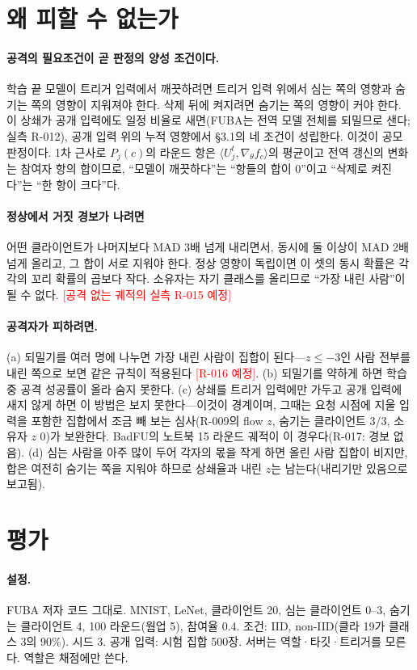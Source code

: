 \documentclass[10pt,a4paper]{article}
\newcommand{\todo}[1]{\textcolor{red}{[#1]}}
\begin{document}
\section{왜 피할 수 없는가}
\paragraph{공격의 필요조건이 곧 판정의 양성 조건이다.} 학습 끝 모델이 트리거 입력에서 깨끗하려면 트리거 입력 위에서 심는 쪽의 영향과 숨기는 쪽의 영향이 지워져야 한다. 삭제 뒤에 켜지려면 숨기는 쪽의 영향이 커야 한다. 이 상쇄가 공개 입력에도 일정 비율로 새면(FUBA는 전역 모델 전체를 되밀므로 샌다; 실측 R-012), 공개 입력 위의 누적 영향에서 \S3.1의 네 조건이 성립한다. 이것이 공모 판정이다. 1차 근사로 $P_j(c)$의 라운드 항은 $\langle U_j^t,\nabla_\theta f_c\rangle$의 평균이고 전역 갱신의 변화는 참여자 항의 합이므로, ``모델이 깨끗하다''는 ``항들의 합이 0''이고 ``삭제로 켜진다''는 ``한 항이 크다''다.
\paragraph{정상에서 거짓 경보가 나려면} 어떤 클라이언트가 나머지보다 MAD 3배 넘게 내리면서, 동시에 둘 이상이 MAD 2배 넘게 올리고, 그 합이 서로 지워야 한다. 정상 영향이 독립이면 이 셋의 동시 확률은 각각의 꼬리 확률의 곱보다 작다. 소유자는 자기 클래스를 올리므로 ``가장 내린 사람''이 될 수 없다. \todo{공격 없는 궤적의 실측 R-015 예정}
\paragraph{공격자가 피하려면.} (a) 되밀기를 여러 명에 나누면 가장 내린 사람이 집합이 된다---$z\le-3$인 사람 전부를 내린 쪽으로 보면 같은 규칙이 적용된다 \todo{R-016 예정}. (b) 되밀기를 약하게 하면 학습 중 공격 성공률이 올라 숨지 못한다. (c) 상쇄를 트리거 입력에만 가두고 공개 입력에 새지 않게 하면 이 방법은 보지 못한다---이것이 경계이며, 그때는 요청 시점에 지울 입력을 포함한 집합에서 조금 빼 보는 심사(R-009의 flow $z$, 숨기는 클라이언트 3/3, 소유자 $z$ 0)가 보완한다. BadFU의 노트북 15 라운드 궤적이 이 경우다(R-017: 경보 없음). (d) 심는 사람을 아주 많이 두어 각자의 몫을 작게 하면 올린 사람 집합이 비지만, 합은 여전히 숨기는 쪽을 지워야 하므로 상쇄율과 내린 $z$는 남는다(내리기만 있음으로 보고됨).

\section{평가}
\paragraph{설정.} FUBA 저자 코드 그대로. MNIST, LeNet, 클라이언트 20, 심는 클라이언트 0--3, 숨기는 클라이언트 4, 100 라운드(웜업 5), 참여율 0.4. 조건: IID, non-IID(클라 19가 클래스 3의 90\%). 시드 3. 공개 입력: 시험 집합 500장. 서버는 역할·타깃·트리거를 모른다. 역할은 채점에만 쓴다.
\end{document}
